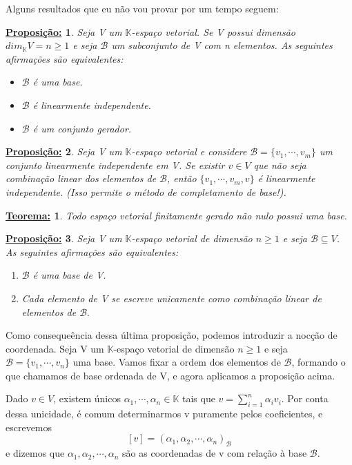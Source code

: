 \documentclass{article}
\newtheorem*{theorem*}{\underline{Teorema:}}
\newtheorem*{proposition*}{\underline{Proposi\c c\~ao:}}
\begin{document}
Alguns resultados que eu n\~ao vou provar por um tempo seguem:
\begin{proposition*}
	Seja V um $\mathbb{K}$-espa\c co vetorial. Se V possui dimens\~ao $dim_{\mathbb{K}}V = n \geq 1$ e seja
	$\mathcal{B}$ um subconjunto de V com n elementos. As seguintes afirma\c c\~oes s\~ao equivalentes:
	\begin{itemize}
		\item [a)] $\mathcal{B}$ \'e uma base.
		\item [b)] $\mathcal{B}$ \'e linearmente independente.
		\item [c)] $\mathcal{B}$ \'e um conjunto gerador.
	\end{itemize}
\end{proposition*}
\begin{proposition*}
	\label{Base_completion}
	Seja V um $\mathbb{K}$-espa\c co vetorial e considere $\mathcal{B} = \{v_1, \cdots, v_m\}$ um conjunto linearmente
	independente em V. Se existir $v\in{V}$ que n\~ao seja combina\c c\~ao linear dos elementos de $\mathcal{B}$, ent\~ao
	$\{v_1, \cdots, v_m, v\}$ \'e  linearmente independente. (Isso permite o m\'etodo de completamento de base!).
\end{proposition*}
\begin{theorem*}
	Todo espa\c co vetorial finitamente gerado n\~ao nulo possui uma base.
\end{theorem*}
\begin{proposition*}
	Seja V um $\mathbb{K}$-espa\c co vetorial de dimens\~ao $n\geq{1}$ e seja $\mathcal{B}\subseteq{V}$. As seguintes
	afirma\c c\~oes s\~ao equivalentes:
	\begin{enumerate}
		\item [a)] $\mathcal{B}$ \'e uma base de V.
		\item [b)] Cada elemento de V se escreve unicamente como combina\c c\~ao linear de elementos de $\mathcal{B}.$
	\end{enumerate}
\end{proposition*}

Como conseque\^encia dessa \'ultima proposi\c c\~ao, podemos introduzir a noc\c c\~ao de coordenada. Seja V
um $\mathbb{K}$-espa\c co vetorial de dimens\~ao $n \geq{1}$ e seja $\mathcal{B} = \{v_1, \cdots, v_n\}$ uma base.
Vamos fixar a ordem dos elementos de $\mathcal{B}$, formando o que chamamos de base ordenada de V, e agora aplicamos
a proposi\c c\~ao acima.

Dado $v\in{V}$, existem \'unicos $\alpha_1, \cdots, \alpha_n\in\mathbb{K}$ tais que $v = \sum_{i=1}^{n}\alpha_iv_i$.
Por conta dessa unicidade, \'e comum determinarmos v puramente pelos coeficientes, e escrevemos
$$
	[v] = (\alpha_1, \alpha_2, \cdots, \alpha_n)_{\mathcal{B}}
$$
e dizemos que $\alpha_1, \alpha_2, \cdots, \alpha_n$ s\~ao as coordenadas de v com rela\c c\~ao \`a base $\mathcal{B}.$
\end{document}
